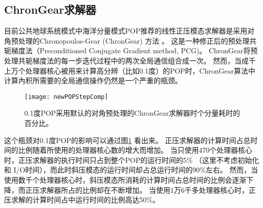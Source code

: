 \subsection{ChronGear求解器}
目前公共地球系统模式中海洋分量模式POP推荐的线性正压模态求解器是采用对角预处理的Chronopoulos-Gear (ChronGear) 方法
\cite{dAzevedo1999lapack}。 这是一种修正后的预处理共轭梯度法（Preconditioned Conjugate
Gradient method, PCG)。 
ChronGear将预处理共轭梯度法的每一步迭代过程中的两次全局通信组合成一次。
然而，当成千上万个处理器核心被用来计算高分辨（比如0.1度）的POP时，ChronGear算法中计算內积所需要的全局通信操作仍然是一个严重的瓶颈。


\begin {figure}
\centering
\texttt{[image: newPOPStepComp]}
\caption[] {0.1度POP采用默认的对角预处理的ChronGear求解器时个分量耗时的百分比。\label{fig:StepComp}}
\end{figure}


这个瓶颈对0.1度POP的影响可以通过图\ref{fig:StepComp} 看出来。
正压求解器的计算时间占总时间的比例随着所使用的处理器核心数的增大而增加。
当只使用470个处理器核心时，正压求解器的执行时间只占到整个POP的运行时间的5\% （这里不考虑初始化和 I/O时间），而此时斜压模态的运行时间却占总运行时间的90\%左右。
然而，当使用数千个处理器核心时，斜压模态所消耗的计算时间占总时间的比例会逐渐下降，而正压求解器所占的比例却在不断增加。
当使用1万6千多处理器核心时，正压求解的计算时间占中运行时间的比例高达50\%。 

